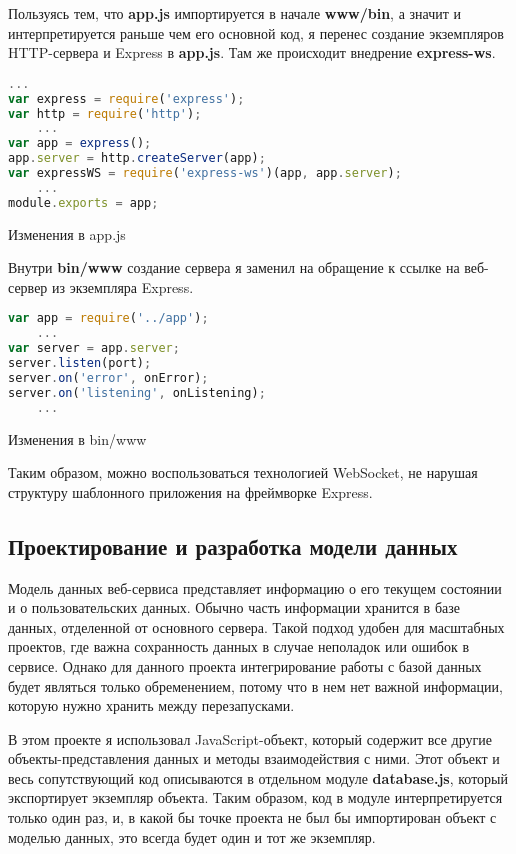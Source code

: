 Пользуясь тем, что \textbf{app.js} импортируется в начале \textbf{www/bin}, а значит и интерпретируется раньше чем его основной код, я перенес создание экземпляров HTTP-сервера и Express в \textbf{app.js}. Там же происходит внедрение \textbf{express-ws}.
\begin{ListingEnv}[H]
\begin{lstlisting}[language=JavaScript]
	...
var express = require('express');
var http = require('http');
	...
var app = express();
app.server = http.createServer(app); 
var expressWS = require('express-ws')(app, app.server);
	...
module.exports = app;
\end{lstlisting}
\caption{Изменения в app.js}
\label{list:appjs-ws}
\end{ListingEnv}  
Внутри \textbf{bin/www} создание сервера я заменил на обращение к ссылке на веб-сервер из экземпляра Express.
\begin{ListingEnv}[H]
\begin{lstlisting}[language=JavaScript]
var app = require('../app');
	...
var server = app.server;
server.listen(port);
server.on('error', onError);
server.on('listening', onListening);
	...
\end{lstlisting}
\caption{Изменения в bin/www}
\label{list:www-ws}
\end{ListingEnv}
Таким образом, можно воспользоваться технологией WebSocket, не нарушая структуру шаблонного приложения на фреймворке Express. 

\subsection{Проектирование и разработка модели данных}
Модель данных веб-сервиса представляет информацию о его текущем состоянии и о пользовательских данных. Обычно часть информации хранится в базе данных, отделенной от основного сервера. Такой подход удобен для масштабных проектов, где важна сохранность данных в случае неполадок или ошибок в сервисе. Однако для данного проекта интегрирование работы с базой данных будет являться только обременением, потому что в нем нет важной информации, которую нужно хранить между перезапусками.

В этом проекте я использовал JavaScript-объект, который содержит все другие объекты-представления данных и методы взаимодействия с ними. Этот объект и весь сопутствующий код описываются в отдельном модуле \textbf{database.js}, который экспортирует экземпляр объекта. Таким образом, код в модуле интерпретируется только один раз, и, в какой бы точке проекта не был бы импортирован объект с моделью данных, это всегда будет один и тот же экземпляр.

